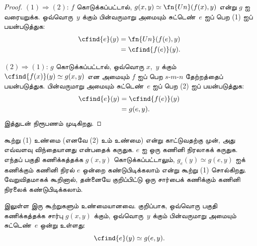 \documentclass[../../../include/open-logic-section]{subfiles}
\begin{document}
\begin{proof}
$(1) \Rightarrow (2)$: $f$ கொடுக்கப்பட்டால்,
$g(x,y) \simeq \fn{Un}(f(x),y)$ என்று $g$ ஐ வரையறுக்க.
ஒவ்வொரு~$y$ க்கும் பின்வருமாறு அமையும் சுட்டெண்~$e$ ஐப் பெற
(1) ஐப் பயன்படுத்துக:
\begin{align*}
\cfind{e}(y) & = \fn{Un}(f(e),y) \\
& = \cfind{f(e)}(y).
\end{align*}

$(2) \Rightarrow (1)$: $g$ கொடுக்கப்பட்டால், ஒவ்வொரு $x$,~$y$
க்கும் $\cfind{f(x)}(y) \simeq g(x,y)$ என அமையும் $f$ ஐப் பெற
$s$-$m$-$n$ தேற்றத்தைப் பயன்படுத்துக. பின்வருமாறு அமையும்
சுட்டெண்~$e$ ஐப் பெற (2) ஐப் பயன்படுத்துக:
\begin{align*}
\cfind{e}(y) & = \cfind{f(e)}(y) \\
& = g(e,y).
\end{align*}
இத்துடன் நிரூபணம் முடிகிறது.
\end{proof}

\begin{explain}
கூற்று (1) உண்மை (எனவே (2) உம் உண்மை) என்று காட்டுவதற்கு முன்,
அது எவ்வளவு விந்தையானது என்பதைக் கருதுக. $e$ ஐ ஒரு கணினி நிரலாகக்
கருதுக. எந்தப் பகுதி கணிக்கத்தக்க $g(x,y)$ கொடுக்கப்பட்டாலும்,
$g_e(y) \simeq g(e,y)$ ஐக் கணிக்கும் கணினி நிரல் $e$ ஒன்றை
கண்டுபிடிக்கலாம் என்று கூற்று (1) சொல்கிறது. வேறுவிதமாகக் கூறினால்,
தன்னையே குறிப்பிட்டு ஒரு சார்பைக் கணிக்கும் கணினி நிரலைக்
கண்டுபிடிக்கலாம்.
\end{explain}

\begin{thm}
 இலுள்ள இரு கூற்றுகளும் உண்மையானவை.
குறிப்பாக, ஒவ்வொரு பகுதி கணிக்கத்தக்க சார்பு $g(x,y)$ க்கும்,
ஒவ்வொரு~$y$ க்கும் பின்வருமாறு அமையும் சுட்டெண்~$e$ ஒன்று உள்ளது:
\[
\cfind{e}(y) \simeq g(e,y).
\]
\end{thm}
\end{document}
